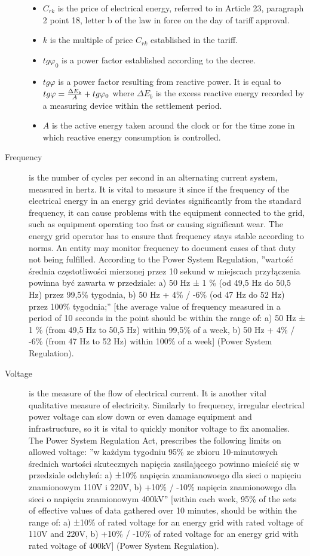 \begin{description}
\begin{itemize}
  \item $C_{rk}$ is the price of electrical energy, referred to in Article 23, paragraph 2 point 18, letter b of the law in force on the day of tariff approval.
  \item $k$ is the multiple of price $C_{rk}$ established in the tariff.
  \item $tg \varphi_{0}$ is a power factor established according to the decree.
  \item $tg \varphi$ is a power factor resulting from reactive power. It is equal to ${tg \varphi} = {{{\Delta E_{b}} \over A} + tg \varphi_{0}}$ where $\Delta E_{b}$ is the excess reactive energy recorded by a measuring device within the settlement period.
  \item $A$ is the active energy taken around the clock or for the time zone in which reactive energy consumption is controlled.
\end{itemize}
  \item[Frequency] is the number of cycles per second in an alternating current system, measured in hertz. It is vital to measure it since if the frequency of the electrical energy in an energy grid deviates significantly from the standard frequency, it can cause problems with the equipment connected to the grid, such as equipment operating too fast or causing significant wear. The energy grid operator has to ensure that frequency stays stable according to norms. An entity may monitor frequency to document cases of that duty not being fulfilled. According to the Power System Regulation, ''wartość średnia częstotliwości mierzonej przez 10 sekund w miejscach przyłączenia powinna być zawarta w przedziale: a) 50 Hz ± 1 \% (od 49,5 Hz do 50,5 Hz) przez 99,5\% tygodnia, b) 50 Hz + 4\% / -6\% (od 47 Hz do 52 Hz) przez 100\% tygodnia;'' [the average value of frequency measured in a period of 10 seconds in the point should be within the range of: a) 50 Hz ± 1 \% (from 49,5 Hz to 50,5 Hz) within 99,5\% of a week, b) 50 Hz + 4\% / -6\% (from 47 Hz to 52 Hz) within 100\% of a week] (Power System Regulation)\citep{psr}.
  \item[Voltage] is the measure of the flow of electrical current. It is another vital qualitative measure of electricity. Similarly to frequency, irregular electrical power voltage can slow down or even damage equipment and infrastructure, so it is vital to quickly monitor voltage to fix anomalies. The Power System Regulation Act, prescribes the following limits on allowed voltage: ''w każdym tygodniu 95\% ze zbioru 10-minutowych średnich wartości skutecznych napięcia zasilającego powinno mieścić się w przedziale odchyleń: a) ±10\% napięcia znamianowoego dla sieci o napięciu znamionowym 110V i 220V, b) +10\% / -10\% napięcia znamionowego dla sieci o napięciu znamionowym 400kV'' [within each week, 95\% of the sets of effective values of data gathered over 10 minutes, should be within the range of: a) ±10\% of rated voltage for an energy grid with rated voltage of 110V and 220V, b) +10\% / -10\% of rated voltage for an energy grid with rated voltage of 400kV] (Power System Regulation)\citep{psr}.
\end{description}

